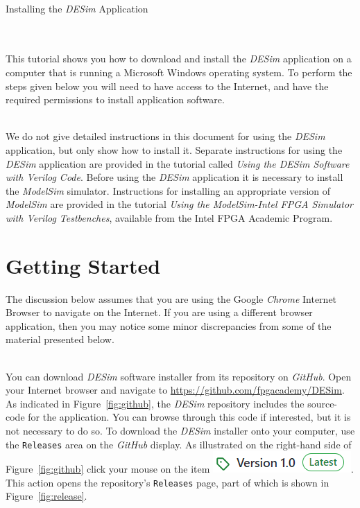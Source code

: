 \documentclass[epsfig,10pt,fullpage]{article} \addtolength{\textwidth}{1.5in}
\begin{document}
~\\
\centerline{\huge Installing the {\it DESim} Application}
~\\
~\\
This tutorial shows you how to download and install the {\it DESim} application
on a computer that is running a Microsoft Windows operating system.  
To perform the steps given below you will need to have 
access to the Internet, and have the required permissions to install application software.

~\\
\noindent
We do not give detailed instructions in this document for using the {\it DESim} application, 
but only show how to install it. Separate instructions for using the {\it DESim} application 
are provided in the tutorial called {\it Using the DESim Software with Verilog Code}.
Before using the {\it DESim} application it is necessary to install the {\it ModelSim} 
simulator. Instructions for installing an appropriate version of {\it ModelSim} are
provided in the tutorial {\it Using the ModelSim-Intel FPGA Simulator with Verilog
Testbenches}, available from the Intel FPGA Academic Program. 

\section*{Getting Started}

The discussion below assumes that you are using the Google {\it Chrome} Internet Browser to
navigate on the Internet.  If you are using a different browser application, then you may
notice some minor discrepancies from some of the material presented below. 

~\\
\noindent
You can download {\it DESim} software installer from its repository on {\it GitHub}. 
Open your Internet browser and navigate to \url{https://github.com/fpgacademy/DESim}.
As indicated in Figure~\ref{fig:github}, the {\it DESim} repository includes the source-code 
for the application. You can browse through this code if interested, but it is not necessary to
do so. To download the {\it DESim} installer onto your computer, use the 
\texttt{Releases} area on the {\it GitHub} display. As illustrated on the right-hand side of
Figure~\ref{fig:github} click your mouse on the item 
\includegraphics[height=\baselineskip]{figures/label.png}. This action opens the
repository's \texttt{Releases} page, part of which is shown in Figure~\ref{fig:release}.
\end{document}

